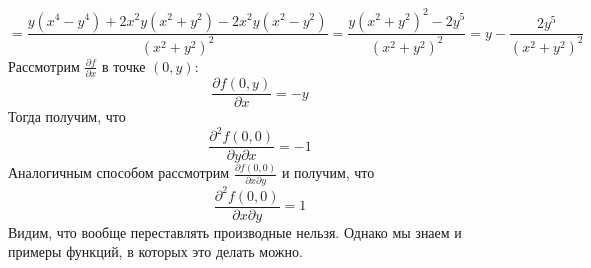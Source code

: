 \documentclass[book, 11pt]{report}
\begin{document}
        \begin{equation*}
            =\frac{y(x^4-y^4)+2x^2y(x^2+y^2)-2x^2y(x^2-y^2)}{(x^2+y^2)^2}=\frac{y(x^2+y^2)^2-2y^5}{(x^2+y^2)^2}=y-\frac{2y^5}{(x^2+y^2)^2}
        \end{equation*}
        Рассмотрим $\frac{\partial f}{\partial x}$ в точке $(0,y)$:
        \begin{equation*}
            \frac{\partial f(0,y)}{\partial x}=-y
        \end{equation*}
        Тогда получим, что
        \begin{equation*}
            \frac{\partial^2f(0,0)}{\partial y\partial x}=-1
        \end{equation*}
        Аналогичным способом рассмотрим $\frac{\partial f(0,0)}{\partial x\partial y}$ и получим, что
        \begin{equation*}
            \frac{\partial^2 f(0,0)}{\partial x\partial y}=1
        \end{equation*}
        Видим, что вообще переставлять производные нельзя. Однако мы знаем и примеры функций, в которых это делать можно.
        \par
        \noindent\hrulefill\noindent
        \par{\ }
\end{document}
